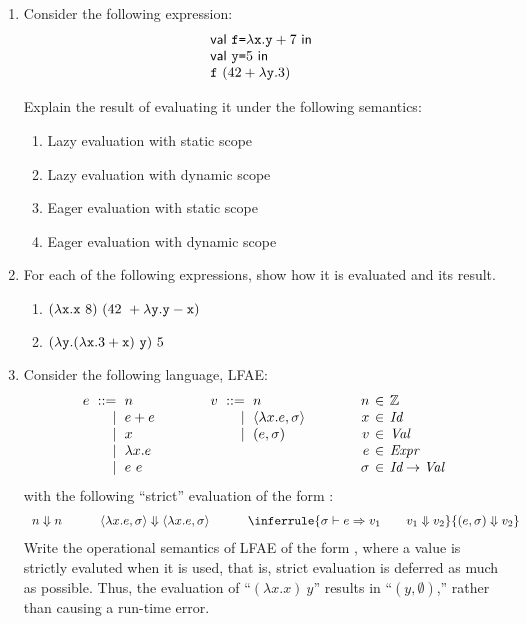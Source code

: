 \begin{enumerate}
\item Consider the following expression:
\[
\begin{array}{l}
  \textsf{val}\ \texttt{f}\texttt{=}\lambda\texttt{x}.\texttt{y}+7\ \textsf{in}\ \\
  \textsf{val}\ \texttt{y}\texttt{=}5\ \textsf{in}\ \\
  \texttt{f}\ (42+\lambda\texttt{y}.3)
 
 
\end{array}
\]

Explain the result of evaluating it under the following semantics:
\begin{enumerate}
  \item Lazy evaluation with static scope
  \item Lazy evaluation with dynamic scope
  \item Eager evaluation with static scope
  \item Eager evaluation with dynamic scope
\end{enumerate}

\item For each of the following \lang expressions, show how it is evaluated and its result.

\begin{enumerate}
  \item
    $(\lambda\texttt{x}.\texttt{x}\ 8)\ (42\ +\lambda\texttt{y}.\texttt{y}-\texttt{x})$
  \item
    $(\lambda\texttt{y}.(\lambda\texttt{x}.3+\texttt{x})\ \texttt{y})\ 5$
\end{enumerate}

\item Consider the following language, LFAE:
\[
  \begin{array}{r@{\hskip6pt}r@{\hskip6pt}l@{\hskip40pt}
    r@{\hskip6pt}r@{\hskip6pt}l@{\hskip40pt}
    r@{\hskip4pt}c@{\hskip4pt}l}
    e &::=& n & v &::=& n & n &\in& \mathbb{Z} \\
    &|& e+e &&|& \clo{x}{e}{\sigma} & x &\in& \textit{Id} \\
    &|& x &&|& (e,\sigma) & v &\in& \textit{Val} \\
    &|& \lambda x.e &&&& e &\in& \textit{Expr} \\
    &|& e\ e &&&& \sigma &\in& \textit{Id}\rightarrow \textit{Val} \\
  \end{array}
\]
with the following ``strict'' evaluation of the form :
\[
\begin{array}{lll}
n \Downarrow n
&\qquad
\clo{x}{e}{\sigma} \Downarrow \clo{x}{e}{\sigma}
&\qquad
\inferrule
{\sigma \vdash e \Rightarrow v_1 \qquad
v_1 \Downarrow v_2 }
{(e, \sigma) \Downarrow v_2}
\end{array}
\]
Write the operational semantics of LFAE of the form
,
where a value is strictly evaluted
when it is used, that is, strict evaluation is deferred as much as possible.
Thus, the evaluation of ``$(\lambda x.x)\ y$'' results in ``$(y,\emptyset)$,''
rather than causing a run-time error.

\end{enumerate}

